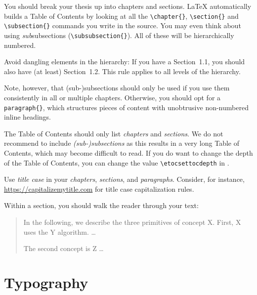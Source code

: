 You should break your thesis up into chapters and sections. LaTeX automatically builds a Table of Contents by looking at all the \verb|\chapter{}|, \verb|\section{}|  and \verb|\subsection{}| commands you write in the source. You may even think about using \emph{sub}subsections (\verb|\subsubsection{}|). All of these will be hierarchically numbered.

Avoid dangling elements in the hierarchy: If you have a Section~1.1, you should also have (at least) Section~1.2. This rule applies to all levels of the hierarchy.

Note, however, that (sub-)subsections should only be used if you use them consistently in all or multiple chapters. Otherwise, you should opt for a \verb|paragraph{}|, which structures pieces of content with unobtrusive non-numbered inline headings.

The Table of Contents should only list \emph{chapters} and \emph{sections}. We do not recommend to include \emph{(sub-)subsections} as this results in a very long Table of Contents, which may become difficult to read. If you do want to change the depth of the Table of Contents, you can change the value \verb|\etocsettocdepth| in .

Use \emph{title case} in your \emph{chapters}, \emph{sections}, and \emph{paragraphs}. Consider, for instance, \url{https://capitalizemytitle.com} for title case capitalization rules.

Within a section, you should walk the reader through your text:
\begin{quote}
In the following, we describe the three primitives of concept X. First, X uses the Y algorithm. …

The second concept is Z …
\end{quote}

\section{Typography}

